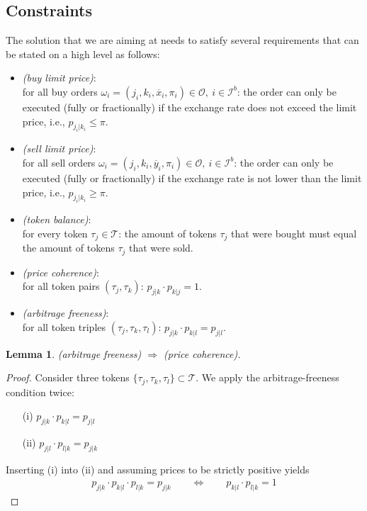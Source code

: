 \documentclass[11pt,parskip=full]{scrartcl}%
\newcommand*{\ie}{i.e., }
\newcommand*{\tokens}{\mathcal{T}}          %
\newcommand*{\orders}{\mathcal{O}}          %
\newcommand*{\ibuyorders}{\mathcal{I}^b}    %
\newtheorem{lemma}[theorem]{Lemma}
\begin{document}
\subsection{Constraints}
\label{subsec:constraints}

The solution that we are aiming at needs to satisfy several requirements that can be stated on a
high level as follows:
\begin{itemize}
  \item \emph{(buy limit price)}:\\
  for all buy orders
  $ \omega_i = (j_i,k_i,\overline{x}_i,\pi_i)  \in \orders, \> i \in \ibuyorders $:
  the order can only be executed (fully or fractionally) if the exchange rate does not exceed the
  limit price, \ie $ p_{j_i|k_i} \le \pi $.
  \item \emph{(sell limit price)}:\\
  for all sell orders
  $ \omega_i = (j_i,k_i,\overline{y}_i,\pi_i)  \in \orders, \> i \in \ibuyorders $:
  the order can only be executed (fully or fractionally) if the exchange rate is not lower than the
  limit price, \ie $ p_{j_i|k_i} \ge \pi $.
  \item \emph{(token balance)}:\\
  for every token $ \tau_j \in \tokens $: the amount of tokens $ \tau_j $ that were bought must
  equal the amount of tokens $ \tau_j $ that were sold.
  \item \emph{(price coherence)}:\\
  for all token pairs $ (\tau_j,\tau_k) $: $ p_{j|k} \cdot p_{k|j} = 1 $.
  \item \emph{(arbitrage freeness)}:\\
  for all token triples $ (\tau_j,\tau_k,\tau_l) $: $ p_{j|k} \cdot p_{k|l} = p_{j|l} $.
\end{itemize}

\vspace{.6cm}
\begin{lemma}
  (arbitrage freeness) $ \Rightarrow $ (price coherence).
\end{lemma}
\vspace{-.8cm}
\begin{proof}
  Consider three tokens $ \{\tau_j,\tau_k,\tau_l\} \subset \tokens $.
  We apply the arbitrage-freeness condition twice:
  \begin{itemize}
    \item[(i)] $ p_{j|k} \cdot p_{k|l} = p_{j|l} $
    \item[(ii)] $ p_{j|l} \cdot p_{l|k} = p_{j|k} $
  \end{itemize}
  Inserting (i) into (ii) and assuming prices to be strictly positive yields
  \begin{align*}
    p_{j|k} \cdot p_{k|l} \cdot p_{l|k} = p_{j|k}
    \qquad \Leftrightarrow \qquad
    p_{k|l} \cdot p_{l|k} = 1
  \end{align*}
\end{proof}
\vspace{-.4cm}
\end{document}
